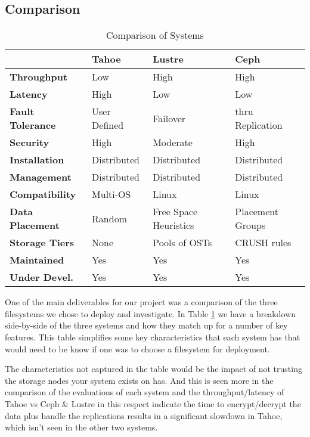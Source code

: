 \documentclass[11pt]{article}
\begin{document}
\subsection{Comparison}
\begin{table}
  \begin{center}
    \begin{tabularx}{\textwidth}{|X|X|X|X|}
      \hline
      {\bf } & {\bf Tahoe} & {\bf Lustre} & {\bf Ceph} \\ \hline
      {\bf Throughput} & Low & High & High \\ \hline
      {\bf Latency} & High & Low & Low \\ \hline
      {\bf Fault Tolerance} & User Defined & Failover & thru Replication \\ \hline
       {\bf Security} & High & Moderate & High \\ \hline
       {\bf Installation} & Distributed & Distributed & Distributed \\ \hline
       {\bf Management} & Distributed & Distributed & Distributed \\ \hline
       {\bf Compatibility} & Multi-OS & Linux & Linux \\ \hline
       {\bf Data Placement} & Random & Free Space Heuristics & Placement Groups \\ \hline
       {\bf Storage Tiers} & None & Pools of OSTs & CRUSH rules \\ \hline
       {\bf Maintained} & Yes & Yes & Yes \\ \hline
        {\bf Under Devel.} & Yes & Yes & Yes \\ \hline
    \end{tabularx}
    \caption{Comparison of Systems}
    \label{tbl:compare}
  \end{center}
\end{table}

One of the main deliverables for our project was a comparison of the three filesystems we chose to deploy and investigate. In Table \ref{tbl:compare} we have a breakdown side-by-side of the three systems and how they match up for a number of key features. This table simplifies some key characteristics that each system has that would need to be know if one was to choose a filesystem for deployment. 

The characteristics not captured in the table would be the impact of not trusting the storage nodes your system exists on has. And this is seen more in the comparison of the evaluations of each system and the throughput/latency of Tahoe vs Ceph \& Lustre in this respect indicate the time to encrypt/decrypt the data plus handle the replications results in a significant slowdown in Tahoe, which isn't seen in the other two systems. 
\end{document}
